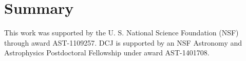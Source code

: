 \documentclass[preprint2,iop,numberedappendix,twocolappendix,appendixfloats]{emulateapj}
\begin{document}

\section{Summary}\label{sec:summary}

\acknowledgments

This work was supported by the U. S. National Science Foundation (NSF) through award AST-1109257. DCJ is supported by an NSF Astronomy and Astrophysics Postdoctoral Fellowship under award AST-1401708. 




\end{document}
